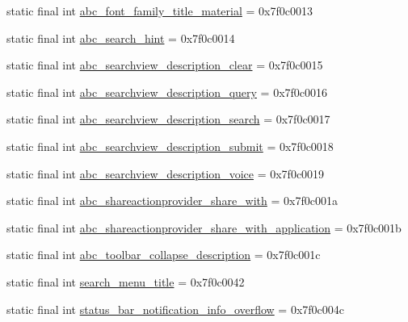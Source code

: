 \begin{DoxyCompactItemize}
\item 
static final int \mbox{\hyperlink{classandroid_1_1support_1_1v7_1_1appcompat_1_1_r_1_1string_ada72478e4c0dd08d9a696a9e0b76c55f}{abc\+\_\+font\+\_\+family\+\_\+title\+\_\+material}} = 0x7f0c0013
\item 
static final int \mbox{\hyperlink{classandroid_1_1support_1_1v7_1_1appcompat_1_1_r_1_1string_a8a977c43ae9b6036b792a424d60ff3ed}{abc\+\_\+search\+\_\+hint}} = 0x7f0c0014
\item 
static final int \mbox{\hyperlink{classandroid_1_1support_1_1v7_1_1appcompat_1_1_r_1_1string_a458a8ba55dea450ed52e936d7fbb4312}{abc\+\_\+searchview\+\_\+description\+\_\+clear}} = 0x7f0c0015
\item 
static final int \mbox{\hyperlink{classandroid_1_1support_1_1v7_1_1appcompat_1_1_r_1_1string_a687a6a0f890080c34188b0570f1ad557}{abc\+\_\+searchview\+\_\+description\+\_\+query}} = 0x7f0c0016
\item 
static final int \mbox{\hyperlink{classandroid_1_1support_1_1v7_1_1appcompat_1_1_r_1_1string_adb0d54ee3eeb2609de19decfc0831c19}{abc\+\_\+searchview\+\_\+description\+\_\+search}} = 0x7f0c0017
\item 
static final int \mbox{\hyperlink{classandroid_1_1support_1_1v7_1_1appcompat_1_1_r_1_1string_ae42251191872922dcd3e42a02b86f36c}{abc\+\_\+searchview\+\_\+description\+\_\+submit}} = 0x7f0c0018
\item 
static final int \mbox{\hyperlink{classandroid_1_1support_1_1v7_1_1appcompat_1_1_r_1_1string_af44447786247cf4c993ba7d749a18d7b}{abc\+\_\+searchview\+\_\+description\+\_\+voice}} = 0x7f0c0019
\item 
static final int \mbox{\hyperlink{classandroid_1_1support_1_1v7_1_1appcompat_1_1_r_1_1string_ada3024d7f8a977c5a49a8cab63c26f27}{abc\+\_\+shareactionprovider\+\_\+share\+\_\+with}} = 0x7f0c001a
\item 
static final int \mbox{\hyperlink{classandroid_1_1support_1_1v7_1_1appcompat_1_1_r_1_1string_acd327651d6f2bbab98396d2967431584}{abc\+\_\+shareactionprovider\+\_\+share\+\_\+with\+\_\+application}} = 0x7f0c001b
\item 
static final int \mbox{\hyperlink{classandroid_1_1support_1_1v7_1_1appcompat_1_1_r_1_1string_a399ac8dfa9600f2c34e5d9f2d3e78edb}{abc\+\_\+toolbar\+\_\+collapse\+\_\+description}} = 0x7f0c001c
\item 
static final int \mbox{\hyperlink{classandroid_1_1support_1_1v7_1_1appcompat_1_1_r_1_1string_a9e8e9a30bc2353e3530f5991216399a4}{search\+\_\+menu\+\_\+title}} = 0x7f0c0042
\item 
static final int \mbox{\hyperlink{classandroid_1_1support_1_1v7_1_1appcompat_1_1_r_1_1string_a7cc8e172b664c63f22e7d64dab601204}{status\+\_\+bar\+\_\+notification\+\_\+info\+\_\+overflow}} = 0x7f0c004c
\end{DoxyCompactItemize}
